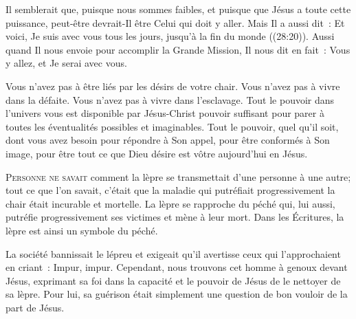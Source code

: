 Il semblerait que, puisque nous sommes faibles, et puisque que Jésus
 a toute cette puissance, peut-être devrait-Il être Celui qui doit y aller.
 Mais Il a aussi dit~: 
 \og Et voici, Je suis avec vous tous les jours,
 jusqu'à la fin du monde \fg{} ((28:20)).
 Aussi quand Il nous envoie pour accomplir la Grande Mission,
 Il nous dit en fait~: 
 \og Vous y allez, et Je serai avec vous. \fg{}



Vous n'avez pas à être liés par les désirs de votre chair.
 Vous n'avez pas à vivre dans la défaite. Vous n'avez pas à vivre
 dans l'esclavage. Tout le pouvoir dans l'univers vous est disponible
 par Jésus-Christ \ocadr pouvoir suffisant pour parer à toutes
 les éventualités possibles et imaginables.
 Tout le pouvoir, quel qu'il soit, dont vous avez besoin
 pour répondre à Son appel, pour être conformés à Son image,
 pour être tout ce que Dieu désire est vôtre aujourd'hui en Jésus. 

\dvrule






\lettrine{P}{ersonne ne savait} comment la lèpre se transmettait
 d'une personne à une autre; tout ce que l'on savait, c'était que la maladie
 \ocadr qui putréfiait progressivement la chair \fcadr{}
 était incurable et mortelle. La lèpre se rapproche du péché qui,
 lui aussi, putréfie progressivement ses victimes et mène à leur mort.
 Dans les Écritures, la lèpre est ainsi un symbole du péché. 

La société bannissait le lépreu et exigeait qu'il avertisse
 ceux qui l'approchaient en criant~: 
 \og Impur, impur. \fg{}
 Cependant, nous trouvons cet homme à genoux devant Jésus,
 exprimant sa foi dans la capacité et le pouvoir de Jésus
 de le nettoyer de sa lèpre. Pour lui, sa guérison était simplement
 une question de bon vouloir de la part de Jésus. 

